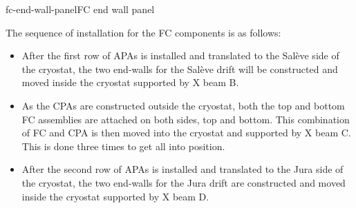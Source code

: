 \begin{cdrfigure}{fc-end-wall-panel}{FC end wall panel }
\end{cdrfigure}

The sequence of installation for the FC components is as follows:
\begin{itemize}
\item After the first row of APAs is installed and translated to the Sal\`{e}ve side of the cryostat, the two end-walls for the Sal\`{e}ve drift will be constructed and moved inside the cryostat supported 
by X beam B.  
\item As the CPAs %
are constructed outside the cryostat, both the top and bottom FC assemblies are attached on both sides, top and bottom.  This combination of FC and CPA is then moved into the cryostat and supported by X beam C.   
This is done three times to get all into position.
\item After the second row of APAs is installed and translated to the Jura side of the cryostat, the two end-walls for the Jura drift are constructed and moved inside the cryostat supported by X beam D.   
\end{itemize}
